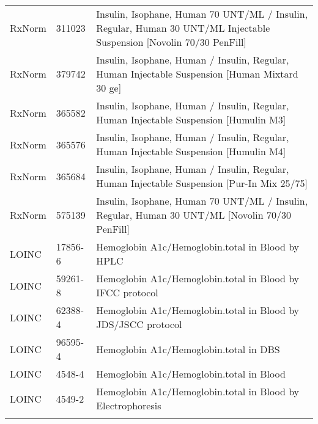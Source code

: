 \begin{longtable}{p{}p{}p{}}
  RxNorm & 311023 & Insulin, Isophane, Human 70 UNT/ML / Insulin, Regular, Human 30 UNT/ML Injectable Suspension [Novolin 70/30 PenFill] \\ 
  RxNorm & 379742 & Insulin, Isophane, Human / Insulin, Regular, Human Injectable Suspension [Human Mixtard 30 ge] \\ 
  RxNorm & 365582 & Insulin, Isophane, Human / Insulin, Regular, Human Injectable Suspension [Humulin M3] \\ 
  RxNorm & 365576 & Insulin, Isophane, Human / Insulin, Regular, Human Injectable Suspension [Humulin M4] \\ 
  RxNorm & 365684 & Insulin, Isophane, Human / Insulin, Regular, Human Injectable Suspension [Pur-In Mix 25/75] \\ 
  RxNorm & 575139 & Insulin, Isophane, Human 70 UNT/ML / Insulin, Regular, Human 30 UNT/ML [Novolin 70/30 PenFill] \\ 
  LOINC & 17856-6 & Hemoglobin A1c/Hemoglobin.total in Blood by HPLC \\ 
  LOINC & 59261-8 & Hemoglobin A1c/Hemoglobin.total in Blood by IFCC protocol \\ 
  LOINC & 62388-4 & Hemoglobin A1c/Hemoglobin.total in Blood by JDS/JSCC protocol \\ 
  LOINC & 96595-4 & Hemoglobin A1c/Hemoglobin.total in DBS \\ 
  LOINC & 4548-4 & Hemoglobin A1c/Hemoglobin.total in Blood \\ 
  LOINC & 4549-2 & Hemoglobin A1c/Hemoglobin.total in Blood by Electrophoresis \\ 
  \hline
\label{tab:codes_t2d_evidence}
\end{longtable}
